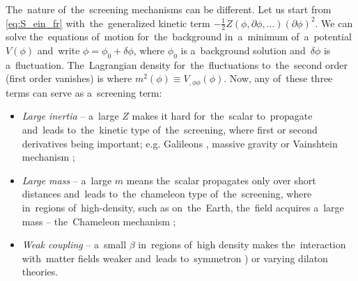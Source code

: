 The~nature of~the~screening mechanisms can be different. Let us start from \eqref{eq:S_ein_fr} with~the~generalized kinetic term $-\frac12 Z(\phi,\partial\phi,...)(\partial\phi)^2$. We can solve the~equations of~motion for~the~background in~a~minimum of~a~potential $V(\phi)$ and~write $\phi=\phi_0+\delta\phi$, where $\phi_0$ is a~background solution and~$\delta\phi$ is a~fluctuation. The~Lagrangian density for~the~fluctuations to~the~second order (first order vanishes) is
where $m^2(\phi)\equiv V_{,\phi\phi}(\phi)$. Now, any of~these three terms can serve as a~screening term:
\begin{itemize}
	\item  \textit{Large inertia} -- a~large $Z$ makes it hard for~the~scalar to~propagate and~leads to~the~kinetic type of~the~screening, where first or second derivatives being important; e.g. Galileons \parencite{2009PhRvD..79f4036N}, massive gravity \parencite{2012RvMP...84..671H} or Vainshtein mechanism \parencite{2013CQGra..30r4001B};
	\item \textit{Large mass} --  a~large $m$ means the~scalar propagates only over short distances and~leads to~the~chameleon type of~the~screening, where in~regions of~high-density, such as on~the~Earth, the~field acquires a~large mass -- the~Chameleon mechanism \parencite{Waterhouse:2006wv};
	\item \textit{Weak coupling} -- a~small $\beta$ in~regions of~high density makes the~interaction with~matter fields weaker and~leads to~symmetron \parencite{2010PhRvL.104w1301H}) or varying dilaton \parencite{Damour:1994zq,2011PhRvD..83j4026B} theories.
\end{itemize}